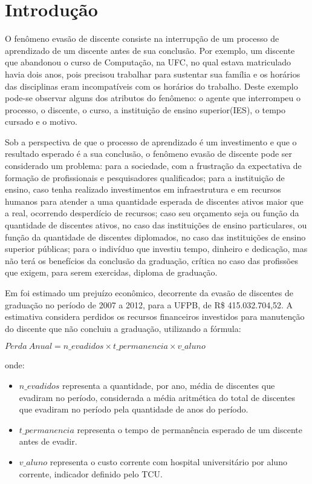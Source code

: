 \chapter{Introdução}


O fenômeno evasão de discente consiste na interrupção de um processo de aprendizado de um discente antes de sua conclusão. Por exemplo, um discente que abandonou o curso de Computação, na UFC, no qual estava matriculado havia dois anos, pois precisou trabalhar para sustentar sua família e os horários das disciplinas eram incompatíveis com os horários do trabalho. Deste exemplo pode-se observar alguns dos atributos do fenômeno: o agente que interrompeu o processo, o discente, o curso, a instituição de ensino superior(IES), o tempo cursado e o motivo.


Sob a perspectiva de que o processo de aprendizado é um investimento e que o resultado esperado é a sua conclusão, o fenômeno evasão de discente pode ser considerado um problema: para a sociedade, com a frustração da expectativa de formação de profissionais e pesquisadores qualificados; para a instituição de ensino, caso tenha realizado investimentos em infraestrutura e em recursos humanos para atender a uma quantidade esperada de discentes ativos maior que a real, ocorrendo desperdício de recursos; caso seu orçamento seja ou função da quantidade de discentes ativos, no caso das instituições de ensino particulares, ou função da quantidade de discentes diplomados, no caso das instituições de ensino superior públicas; para o indivíduo que investiu tempo, dinheiro e dedicação, mas não terá os benefícios da conclusão da graduação, crítica no caso das profissões que exigem, para serem exercidas, diploma de graduação.

Em \cite{evasao_global} foi estimado um prejuízo econômico, decorrente da evasão de discentes de graduação no período de 2007 a 2012, para a UFPB, de R\$ 415.032.704,52. A estimativa considera perdidos os recursos financeiros investidos para manutenção do discente que não concluiu a graduação, utilizando a fórmula:

$Perda\ Anual=n\_evadidos \times t\_permanencia \times v\_aluno$

onde:
\begin{itemize}
\item $n\_evadidos$ representa a quantidade, por ano, média de discentes que evadiram no período, considerada a média aritmética do total de discentes que evadiram no período pela quantidade de anos do período.
\item $t\_permanencia$ representa o tempo de permanência esperado de um discente antes de evadir.
\item $v\_aluno$ representa o custo corrente com hospital universitário por aluno corrente, indicador definido pelo TCU\cite{indicadores_TCU}.
\end{itemize}

